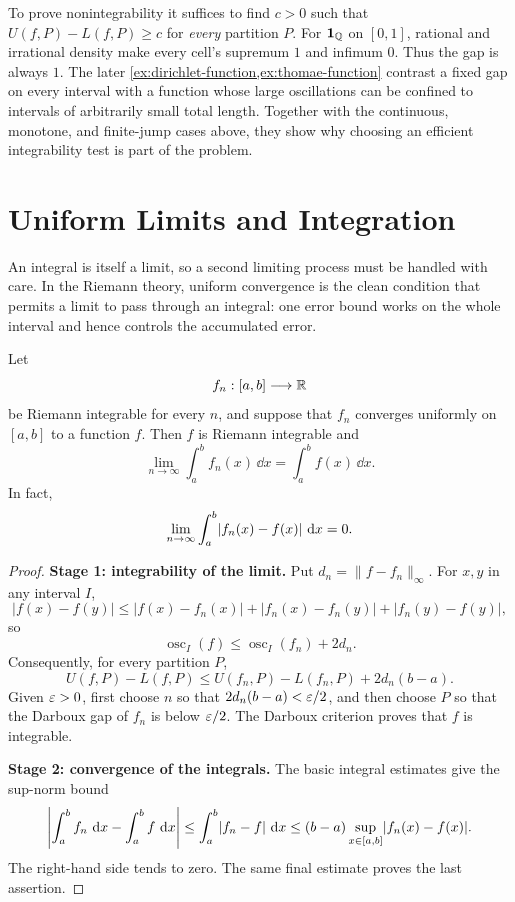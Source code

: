To prove nonintegrability it suffices to find $c>0$ such that
$U(f,P)-L(f,P)\geq c$ for \emph{every} partition $P$.
For $\mathbf1_{\mathbb{Q}}$ on $[0,1]$, rational and irrational density make
every cell's supremum $1$ and infimum $0$. Thus the gap is always $1$.
The later \cref{ex:dirichlet-function,ex:thomae-function} contrast a fixed
gap on every interval with a function whose large oscillations can be
confined to intervals of arbitrarily small total length. Together with the
continuous, monotone, and finite-jump cases above, they show why choosing an
efficient integrability test is part of the problem.

\section{Uniform Limits and Integration}

An integral is itself a limit, so a second limiting process must be handled
with care.  In the Riemann theory, uniform convergence is the clean
condition that permits a limit to pass through an integral: one error bound
works on the whole interval and hence controls the accumulated error.

\begin{theorem}
\label{thm:uniform-riemann-integration}
Let
\[
f_n:[a,b]\longrightarrow\mathbb{R}
\]
be Riemann integrable for every \(n\), and suppose that \(f_n\) converges
uniformly on \([a,b]\) to a function \(f\).  Then \(f\) is Riemann
integrable and
\[
\lim_{n\to\infty}\int_a^b f_n(x)\,\dd x
=
\int_a^b f(x)\,\dd x.
\]
In fact,
\[
\lim_{n\to\infty}\int_a^b\lvert f_n(x)-f(x)\rvert\,\mathop{}\!\mathrm{d} x=0.
\]
\end{theorem}
\begin{proof}
\textbf{Stage 1: integrability of the limit.}
Put $d_n=\|f-f_n\|_\infty$. For $x,y$ in any interval $I$,
\[
|f(x)-f(y)|\leq|f(x)-f_n(x)|+|f_n(x)-f_n(y)|
                   +|f_n(y)-f(y)|,
\]
so
\[
\operatorname{osc}_I(f)\leq\operatorname{osc}_I(f_n)+2d_n.
\]
Consequently, for every partition $P$,
\[
U(f,P)-L(f,P)
\leq U(f_n,P)-L(f_n,P)+2d_n(b-a).
\]
Given $\varepsilon>0$, first choose $n$ so that $2d_n(b-a)<\varepsilon/2$, and then
choose $P$ so that the Darboux gap of $f_n$ is below $\varepsilon/2$. The Darboux
criterion proves that $f$ is integrable.

\textbf{Stage 2: convergence of the integrals.}
The basic integral estimates give the sup-norm bound
\[
\left\lvert
\int_a^b f_n\,\mathop{}\!\mathrm{d} x-\int_a^b f\,\mathop{}\!\mathrm{d} x
\right\rvert
\leq
\int_a^b\lvert f_n-f\rvert\,\mathop{}\!\mathrm{d} x
\leq
(b-a)\sup_{x\in[a,b]}\lvert f_n(x)-f(x)\rvert.
\]
The right-hand side tends to zero.  The same final estimate proves the last
assertion.
\end{proof}

